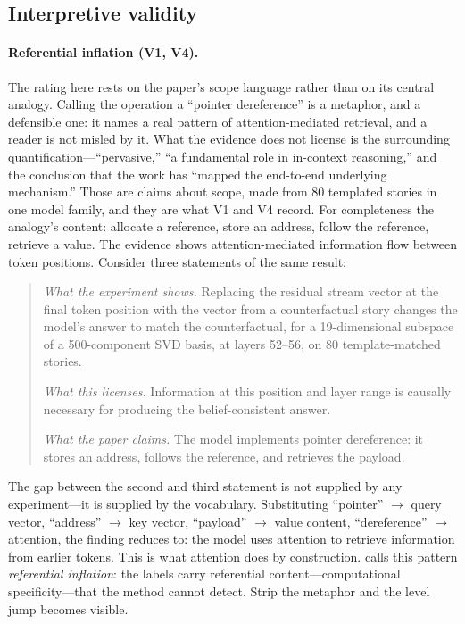 \documentclass{article}
\begin{document}
\subsection{Interpretive validity}

\paragraph{Referential inflation (V1, V4).}
The rating here rests on the paper's scope language rather than on its central analogy. Calling the operation a ``pointer dereference'' is a metaphor, and a defensible one: it names a real pattern of attention-mediated retrieval, and a reader is not misled by it. What the evidence does not license is the surrounding quantification---``pervasive,'' ``a fundamental role in in-context reasoning,'' and the conclusion that the work has ``mapped the end-to-end underlying mechanism.'' Those are claims about scope, made from 80 templated stories in one model family, and they are what V1 and V4 record. For completeness the analogy's content: allocate a reference, store an address, follow the reference, retrieve a value. The evidence shows attention-mediated information flow between token positions. Consider three statements of the same result:

\begin{quote}
\emph{What the experiment shows.} Replacing the residual stream vector at the final token position with the vector from a counterfactual story changes the model's answer to match the counterfactual, for a 19-dimensional subspace of a 500-component SVD basis, at layers 52--56, on 80 template-matched stories.

\emph{What this licenses.} Information at this position and layer range is causally necessary for producing the belief-consistent answer.

\emph{What the paper claims.} The model implements pointer dereference: it stores an address, follows the reference, and retrieves the payload.
\end{quote}

The gap between the second and third statement is not supplied by any experiment---it is supplied by the vocabulary. Substituting ``pointer'' $\rightarrow$ query vector, ``address'' $\rightarrow$ key vector, ``payload'' $\rightarrow$ value content, ``dereference'' $\rightarrow$ attention, the finding reduces to: the model uses attention to retrieve information from earlier tokens. This is what attention does by construction. \citet{tower2026mechref} calls this pattern \emph{referential inflation}: the labels carry referential content---computational specificity---that the method cannot detect. Strip the metaphor and the level jump becomes visible.
\end{document}
